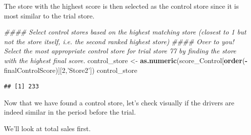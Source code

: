 \documentclass[]{article}
\newenvironment{Shaded}{\begin{snugshade}}{\end{snugshade}}
\newcommand{\CommentTok}[1]{\textcolor[rgb]{0.56,0.35,0.01}{\textit{#1}}}
\newcommand{\DecValTok}[1]{\textcolor[rgb]{0.00,0.00,0.81}{#1}}
\newcommand{\KeywordTok}[1]{\textcolor[rgb]{0.13,0.29,0.53}{\textbf{#1}}}
\newcommand{\NormalTok}[1]{#1}
\newcommand{\OperatorTok}[1]{\textcolor[rgb]{0.81,0.36,0.00}{\textbf{#1}}}
\newcommand{\StringTok}[1]{\textcolor[rgb]{0.31,0.60,0.02}{#1}}
\begin{document}
The store with the highest score is then selected as the control store
since it is most similar to the trial store.

\begin{Shaded}
\begin{Highlighting}[]
\CommentTok{#### Select control stores based on the highest matching store (closest to 1 but not the store itself, i.e. the second ranked highest store)}
\CommentTok{#### Over to you! Select the most appropriate control store for trial store 77 by finding the store with the highest final score.}
\NormalTok{control_store <-}\StringTok{ }\KeywordTok{as.numeric}\NormalTok{(score_Control[}\KeywordTok{order}\NormalTok{(}\OperatorTok{-}\NormalTok{finalControlScore)][}\DecValTok{2}\NormalTok{,}\StringTok{'Store2'}\NormalTok{])}
\NormalTok{control_store}
\end{Highlighting}
\end{Shaded}

\begin{verbatim}
## [1] 233
\end{verbatim}

Now that we have found a control store, let's check visually if the
drivers are indeed similar in the period before the trial.

We'll look at total sales first.
\end{document}
